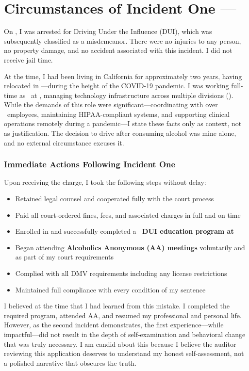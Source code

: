 \section{Circumstances of Incident One --- \IncidentOneDate}

On \IncidentOneDate, I was arrested for Driving Under the Influence (DUI), which was subsequently classified as a misdemeanor. There were no injuries to any person, no property damage, and no accident associated with this incident. I did not receive jail time.

At the time, I had been living in California for approximately two years, having relocated in \EmployerSince---during the height of the COVID-19 pandemic. I was working full-time as \EmployerRole\ at \EmployerName, managing technology infrastructure across multiple divisions (\EmployerDivisions). While the demands of this role were significant---coordinating with over \TeamSize\ employees, maintaining HIPAA-compliant systems, and supporting clinical operations remotely during a pandemic---I state these facts only as context, not as justification. The decision to drive after consuming alcohol was mine alone, and no external circumstance excuses it.

\subsubsection{Immediate Actions Following Incident One}

Upon receiving the charge, I took the following steps without delay:

\begin{itemize}[leftmargin=2em, itemsep=0.2em]
  \item Retained legal counsel and cooperated fully with the court process
  \item Paid all court-ordered fines, fees, and associated charges in full and on time
  \item Enrolled in and successfully completed a \textbf{\DUIProgramOneDuration\ DUI education program at \DUIProgramOne}
  \item Began attending \textbf{Alcoholics Anonymous (AA) meetings} voluntarily and as part of my court requirements
  \item Complied with all DMV requirements including any license restrictions
  \item Maintained full compliance with every condition of my sentence
\end{itemize}

I believed at the time that I had learned from this mistake. I completed the required program, attended AA, and resumed my professional and personal life. However, as the second incident demonstrates, the first experience---while impactful---did not result in the depth of self-examination and behavioral change that was truly necessary. I am candid about this because I believe the auditor reviewing this application deserves to understand my honest self-assessment, not a polished narrative that obscures the truth.
